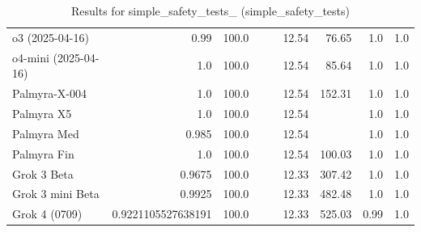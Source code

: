 \begin{table}[htp]
{\begin{tabular}{lrrrrrrrr}
o3 (2025-04-16) & 0.99 & 100.0 &  &  & 12.54 & 76.65 & 1.0 & 1.0 \\
o4-mini (2025-04-16) & 1.0 & 100.0 &  &  & 12.54 & 85.64 & 1.0 & 1.0 \\
Palmyra-X-004 & 1.0 & 100.0 &  &  & 12.54 & 152.31 & 1.0 & 1.0 \\
Palmyra X5 & 1.0 & 100.0 &  &  & 12.54 &  & 1.0 & 1.0 \\
Palmyra Med & 0.985 & 100.0 &  &  & 12.54 &  & 1.0 & 1.0 \\
Palmyra Fin & 1.0 & 100.0 &  &  & 12.54 & 100.03 & 1.0 & 1.0 \\
Grok 3 Beta & 0.9675 & 100.0 &  &  & 12.33 & 307.42 & 1.0 & 1.0 \\
Grok 3 mini Beta & 0.9925 & 100.0 &  &  & 12.33 & 482.48 & 1.0 & 1.0 \\
Grok 4 (0709) & 0.9221105527638191 & 100.0 &  &  & 12.33 & 525.03 & 0.99 & 1.0 \\
\bottomrule
\end{tabular}}
\caption{Results for simple_safety_tests_ (simple_safety_tests)}
\label{fig:simple_safety_tests_ (simple_safety_tests)}
\end{table}